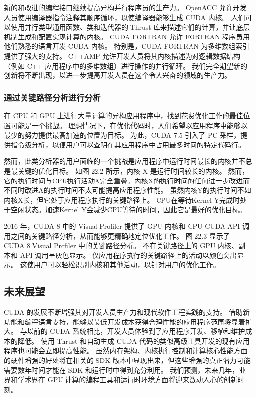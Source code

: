 新的和改进的编程接口继续提高异构并行程序员的生产力。 OpenACC 允许开发人员使用编译器指令注释其顺序循环，以使编译器能够生成 CUDA 内核。 人们可以使用并行类型通用函数、类和迭代器的 Thrust 库来描述它们的计算，并让底层机制生成和配置实现计算的内核。 CUDA FORTRAN 允许 FORTRAN 程序员用他们熟悉的语言开发 CUDA 内核。 特别是，CUDA FORTRAN 为多维数组索引提供了强大的支持。 C++AMP 允许开发人员将其内核描述为对逻辑数据结构（例如 C++ 应用程序中的多维数组）进行操作的并行循环。 我们完全期望新的创新将不断出现，以进一步提高开发人员在这个令人兴奋的领域的生产力。

\subsubsection{通过关键路径分析进行分析}
在 CPU 和 GPU 上进行大量计算的异构应用程序中，找到花费优化工作的最佳位置可能是一个挑战。 理想情况下，在优化代码时，人们希望以应用程序中能够以最少的努力提供最高加速的位置为目标。 为此，CUDA 7.5 引入了 PC 采样，提供指令级分析，以便用户可以查明在其应用程序中占用最多时间的特定代码行。

然而，此类分析器的用户面临的一个挑战是应用程序中运行时间最长的内核并不总是最关键的优化目标。 如图 22.2 所示，内核 X 是运行时间较长的内核。 然而，它的执行时间与CPU执行活动A完全重叠。内核X的执行时间的任何进一步改进而不同时改进A的执行时间不太可能提高应用程序性能。 虽然内核Y的执行时间不如内核X长，但它处于应用程序执行的关键路径上。 CPU在等待Kernel Y完成时处于空闲状态。加速Kernel Y会减少CPU等待的时间，因此它是最好的优化目标。

2016 年，CUDA 8 中的 Visual Profiler 提供了 GPU 内核和 CPU CUDA API 调用之间的关键路径分析，从而能够更精确地定位优化工作。 图 22.3 显示了 CUDA 8 Visual Profiler 中的关键路径分析。 不在关键路径上的 GPU 内核、副本和 API 调用呈灰色显示。 仅应用程序执行的关键路径上的活动以颜色突出显示。 这使用户可以轻松识别内核和其他活动，以针对用户的优化工作。

\subsection{未来展望}
CUDA 的发展不断增强其对开发人员生产力和现代软件工程实践的支持。 借助新功能和编程语言支持，能够以最低开发成本获得合理性能的应用程序范围将显着扩大。 与以前的 CUDA 系统相比，开发人员体验到了应用程序开发、移植和维护成本的降低。 使用 Thrust 和自动生成 CUDA 代码的类似高级工具开发的现有应用程序也可能会立即提高性能。 虽然内存架构、内核执行控制和计算核心性能方面的硬件增强的好处将在相关的 SDK 版本中显现出来，但这些增强的真正潜力可能需要数年时间才能在 SDK 和运行时中得到充分利用。 我们预测，未来几年，业界和学术界在 GPU 计算的编程工具和运行时环境方面将迎来激动人心的创新时刻。









